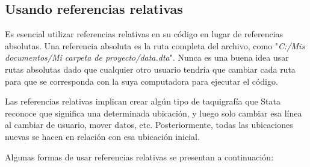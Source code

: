 \documentclass[11pt,en]{elegantpaper}
\begin{document}
\subsection{Usando referencias relativas}
\label{sec:refrelativas}

Es esencial utilizar referencias relativas en su código en lugar de referencias absolutas. Una referencia absoluta es la ruta completa del archivo, como "\textit{C:/Mis documentos/Mi carpeta de proyecto/data.dta}". Nunca es una buena idea usar rutas absolutas dado que cualquier otro usuario tendría que cambiar cada ruta para que se corresponda con la suya computadora para ejecutar el código.

Las referencias relativas implican crear algún tipo de taquigrafía que Stata reconoce que significa una determinada ubicación, y luego solo cambiar esa línea al cambiar de usuario, mover datos, etc. Posteriormente, todas las ubicaciones nuevas se hacen en relación con esa ubicación inicial.

Algunas formas de usar referencias relativas se presentan a continuación:
\end{document}
